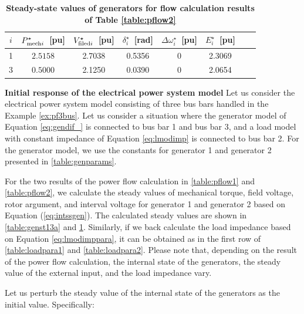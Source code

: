 \documentclass[graybox, envcountchap]{svmult}
\begin{document}
\begin{table}[ht]
\medskip
 \caption{\textbf{Steady-state values of generators for flow calculation results of Table \ref{table:pflow2}}}
 \label{table:genst13b}
 \centering
  \begin{tabular}{cccccccc}
   \hline
$i$ &  $P_{{\rm mech}i}^{\star}$~[pu] & $V_{{\rm filed}i}^{\star}$~[pu] & $\delta_i^{\star}$~[rad] & $\Delta \omega_i^{\star}$~[pu] & $E_i^{\star}$~[pu] \\
   \hline \hline
1 & $2.5158$ & 2.7038 & 0.5356 & 0 & 2.3069 \\
3 & $0.5000$ & 2.1250 & 0.0390 & 0 & 2.0654 \\
   \hline
  \end{tabular}
\end{table}


\begin{example}{\textbf{\textbf{Initial response of the electrical power system
model}}}\label{ex:inires}
Let us consider the electrical power system model consisting of three bus bars
handled in the Example \ref{ex:pf3bus}.  Let us consider a situation where the
generator model of Equation \ref{eq:gendif_} is connected to bus bar 1 and bus
bar 3, and a load model with constant impedance of Equation \ref{eq:lmodimp} is
connected to bus bar 2.  For the generator model, we use the constants for
generator 1 and generator 2 presented in \ref{table:genparams}.

For the two results of the power flow calculation in \ref{table:pflow1} and
\ref{table:pflow2}, we calculate the steady values of mechanical torque, field
voltage, rotor argument, and interval voltage for generator 1 and generator 2
based on Equation (\ref{eq:intssgen}).  The calculated steady values are shown
in \ref{table:genst13a} and \ref{table:genst13b}.  Similarly, if we back
calculate the load impedance based on Equation \ref{eq:lmodimppara}, it can be
obtained as in the first row of \ref{table:loadpara1} and \ref{table:loadpara2}.
Please note that, depending on the result of the power flow calculation, the
internal state of the generators, the steady value of the external input, and
the load impedance vary.

Let us perturb the steady value of the internal state of the generators as the
initial value.  Specifically:


\end{example}
\end{document}
